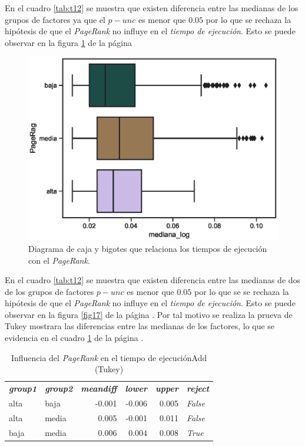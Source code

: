 \documentclass{article}
\begin{document}
En el cuadro \ref{tab:t12} se muestra que existen diferencia entre las medianas de los grupos de factores ya que el \emph{$p-unc$} es menor que $0.05$ por lo que se rechaza la hipótesis de que el \textit{PageRank} no influye en el \textit{tiempo de ejecución}. Esto se puede observar en la figura \ref{fig18} de la página \pageref{fig18}

\begin{center}
\begin{figure}[htbp]
\includegraphics[scale=0.6]{boxplot_PageRag.eps}
\caption{Diagrama de caja y bigotes que relaciona los tiempos de ejecución con el \textit{PageRank}.}
\label{fig18}
\end{figure}
\end{center}


En el cuadro \ref{tab:t12} se muestra que existen  diferencia entre las medianas de dos de los grupos de factores  \textbf{$p-unc$} es menor que $0.05$ por lo que se se rechaza la hipótesis de que el \textit{PageRank} no influye en el \textit{tiempo de ejecución}. Esto se puede observar en la figura \ref{fig17} de la página \pageref{fig17}. Por tal motivo se realiza la prueva de Tukey mostrara las diferencias entre las medianas de los factores, lo que se evidencia en el cuadro \ref{tab:t19} de la página \pageref{tab:t19}.

\begin{table}[htbp]
  \centering
  \caption{Influencia del \textit{PageRank} en el tiempo de ejecuciónAdd (Tukey)}
    \begin{tabular}{llrrrl}
    \textit{\textbf{group1}} & \textit{\textbf{group2}} & \multicolumn{1}{l}{\textit{\textbf{meandiff}}} & \multicolumn{1}{l}{\textit{\textbf{lower}}} & \multicolumn{1}{l}{\textit{\textbf{upper}}} & \textit{\textbf{reject}} \\
    alta  & baja  & -0.001 & -0.006 & 0.005 & \textit{False} \\
    alta  & media & 0.005 & -0.001 & 0.011 & \textit{False} \\
    baja  & media & 0.006 & 0.004 & 0.008 & \textit{True} \\
    \end{tabular}%
  \label{tab:t19}%
\end{table}%
\end{document}
